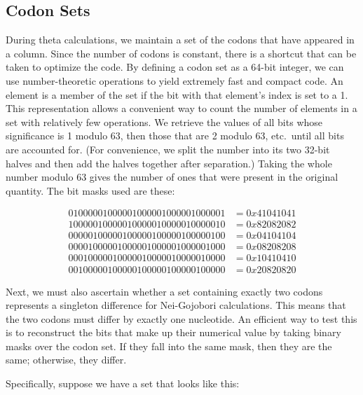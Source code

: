 \documentclass{article}
\begin{document}
    \subsection{Codon Sets}
      \label{sec:codon-sets}

      During theta calculations, we maintain a set of the codons that have
      appeared in a column. Since the number of codons is constant, there is a
      shortcut that can be taken to optimize the code. By defining a codon set
      as a 64-bit integer, we can use number-theoretic operations to yield
      extremely fast and compact code. An element is a member of the set if the
      bit with that element's index is set to a 1. This representation allows a
      convenient way to count the number of elements in a set with relatively
      few operations. We retrieve the values of all bits whose significance is 1
      modulo 63, then those that are 2 modulo 63, etc.\ until all bits are
      accounted for. (For convenience, we split the number into its two 32-bit
	  halves and then add the halves together after separation.) Taking the
      whole number modulo 63 gives the number of ones that were present in the
      original quantity. The bit masks used are these:

      \begin{align*}
        01000001000001000001000001000001 & = 0x41041041 \\ %
        10000010000010000010000010000010 & = 0x82082082 \\ %
        00000100000100000100000100000100 & = 0x04104104 \\ %
        00001000001000001000001000001000 & = 0x08208208 \\ %
        00010000010000010000010000010000 & = 0x10410410 \\ %
        00100000100000100000100000100000 & = 0x20820820
      \end{align*}

      Next, we must also ascertain whether a set containing exactly two codons
      represents a singleton difference for Nei-Gojobori calculations. This
      means that the two codons must differ by exactly one nucleotide. An
      efficient way to test this is to reconstruct the bits that make up their
      numerical value by taking binary masks over the codon set. If they fall
      into the same mask, then they are the same; otherwise, they differ.

      Specifically, suppose we have a set that looks like this:
\end{document}
